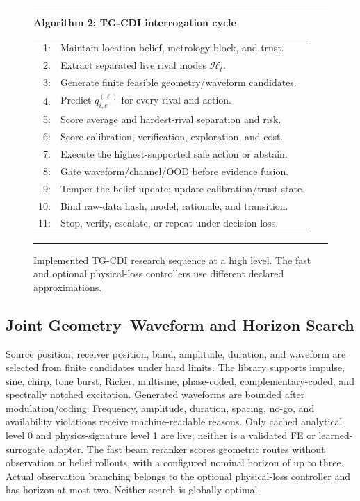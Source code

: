 \documentclass[conference]{IEEEtran}
\begin{document}
\begin{figure}[t]
\centering
\begin{minipage}{0.98\columnwidth}
\hrule
\vspace{1mm}
\noindent\textbf{Algorithm 2: TG-CDI interrogation cycle}\par
\small
\begin{tabular}{@{}r p{}@{}}
1: & Maintain location belief, metrology block, and trust.\\
2: & Extract separated live rival modes $\mathcal H_t$.\\
3: & Generate finite feasible geometry/waveform candidates.\\
4: & Predict $q_{i,e}^{(\ell)}$ for every rival and action.\\
5: & Score average and hardest-rival separation and risk.\\
6: & Score calibration, verification, exploration, and cost.\\
7: & Execute the highest-supported safe action or abstain.\\
8: & Gate waveform/channel/OOD before evidence fusion.\\
9: & Temper the belief update; update calibration/trust state.\\
10: & Bind raw-data hash, model, rationale, and transition.\\
11: & Stop, verify, escalate, or repeat under decision loss.\\
\end{tabular}
\vspace{1mm}
\hrule
\end{minipage}
\caption{Implemented TG-CDI research sequence at a high level. The fast and optional physical-loss controllers use different declared approximations.}
\label{alg:tgcdi}
\end{figure}

\subsection{Joint Geometry--Waveform and Horizon Search}
Source position, receiver position, band, amplitude, duration, and waveform are selected from finite candidates under hard limits. The library supports impulse, sine, chirp, tone burst, Ricker, multisine, phase-coded, complementary-coded, and spectrally notched excitation. Generated waveforms are bounded after modulation/coding. Frequency, amplitude, duration, spacing, no-go, and availability violations receive machine-readable reasons. Only cached analytical level 0 and physics-signature level 1 are live; neither is a validated FE or learned-surrogate adapter. The fast beam reranker scores geometric routes without observation or belief rollouts, with a configured nominal horizon of up to three. Actual observation branching belongs to the optional physical-loss controller and has horizon at most two. Neither search is globally optimal.
\end{document}
